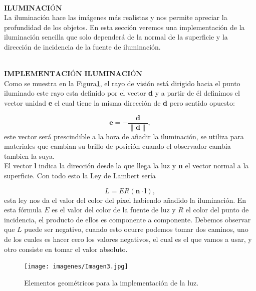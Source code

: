 ${ }$\\
$\textbf{ILUMINACIÓN}$
${ }$\\

La iluminación hace las imágenes más realistas y nos permite apreciar la profundidad de los objetos. En esta sección veremos una implementación de la iluminación sencilla que solo dependerá de la normal de la superficie y la dirección de incidencia de la fuente de iluminación. 


${ }$\\
$\textbf{IMPLEMENTACIÓN ILUMINACIÓN}$
${ }$\\

Como se muestra en la Figura\ref{fig:etiq_5}, el rayo de visión está dirigido hacia el punto iluminado este rayo esta definido por el vector \textbf{d} y a partir de él definimos el vector unidad \textbf{e} el cual tiene la misma dirección de \textbf{d} pero sentido opuesto:



\[
	\textbf{e} = - \frac{\textbf{d}}{\|\textbf{d}\|},
\]
este vector será prescindible a la hora de añadir la iluminación, se utiliza para materiales que cambian su brillo de posición cuando el observador cambia tambien la suya.
${ }$\\


El vector \textbf{l} indica la dirección desde la que llega la luz y \textbf{n} el vector normal a la superficie. Con todo esto la Ley de Lambert sería

\[
	L = ER(\textbf{n}\cdot \textbf{l}),
\]
esta ley nos da el valor del color del pixel habiendo añadido la iluminación. En esta fórmula $E$ es el valor del color de la fuente de luz y $R$ el color del punto de incidencia, el producto de ellos es componente a componente. Debemos observar que $L$ puede ser negativo, cuando esto ocurre podemos tomar dos caminos, uno de los cuales es hacer cero los valores negativos, el cual es el que vamos a usar, y otro consiste en tomar el valor absoluto.
	${ }$\\	


\begin{figure}
	\begin{center}
		\texttt{[image: imagenes/Imagen3.jpg]}
	\end{center}
	\caption{Elementos geométricos para la implementación de la luz.}
	\label{fig:etiq_5}
\end{figure}





